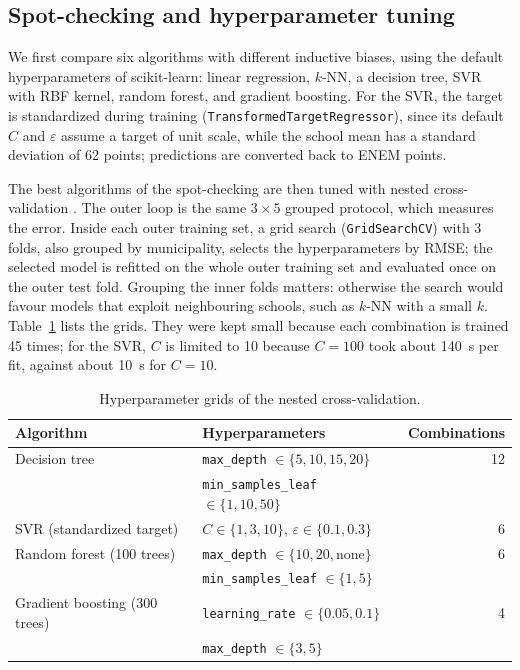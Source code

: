 \subsection{Spot-checking and hyperparameter tuning}
\label{sec:tuning}

We first compare six algorithms with different inductive biases, using the default
hyperparameters of scikit-learn: linear regression, $k$-NN, a decision tree, SVR with RBF kernel,
random forest, and gradient boosting. For the SVR, the target is standardized during training
(\texttt{TransformedTargetRegressor}), since its default $C$ and $\varepsilon$ assume a target of
unit scale, while the school mean has a standard deviation of 62 points; predictions are converted
back to ENEM points.

The best algorithms of the spot-checking are then tuned with nested cross-validation
\cite{cawley2010overfitting}. The outer loop is the same $3 \times 5$ grouped protocol, which
measures the error. Inside each outer training set, a grid search (\texttt{GridSearchCV}) with 3
folds, also grouped by municipality, selects the hyperparameters by RMSE; the selected model is
refitted on the whole outer training set and evaluated once on the outer test fold. Grouping the
inner folds matters: otherwise the search would favour models that exploit neighbouring schools,
such as $k$-NN with a small $k$. Table~\ref{tab:grids} lists the grids. They were kept small
because each combination is trained 45 times; for the SVR, $C$ is limited to 10 because $C = 100$
took about 140~s per fit, against about 10~s for $C = 10$.

\begin{table}[htbp]
  \centering
  \caption{Hyperparameter grids of the nested cross-validation.}
  \label{tab:grids}
  \small
  \begin{tabular}{llr}
    \hline
    Algorithm & Hyperparameters & Combinations \\
    \hline
    Decision tree & \texttt{max\_depth} $\in \{5, 10, 15, 20\}$ & 12 \\
                  & \texttt{min\_samples\_leaf} $\in \{1, 10, 50\}$ & \\
    SVR (standardized target) & $C \in \{1, 3, 10\}$, $\varepsilon \in \{0.1, 0.3\}$ & 6 \\
    Random forest (100 trees) & \texttt{max\_depth} $\in \{10, 20, \mathrm{none}\}$ & 6 \\
                              & \texttt{min\_samples\_leaf} $\in \{1, 5\}$ & \\
    Gradient boosting (300 trees) & \texttt{learning\_rate} $\in \{0.05, 0.1\}$ & 4 \\
                                  & \texttt{max\_depth} $\in \{3, 5\}$ & \\
    \hline
  \end{tabular}
\end{table}

